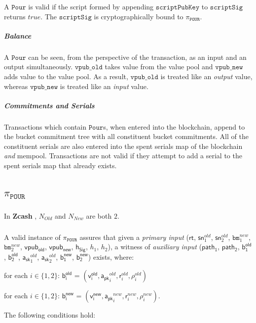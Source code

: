 \documentclass[8pt]{article}
\newcommand{\Zcash}{\textbf{Zcash} }
\newcommand{\SpendAuthorityPublic}{\mathsf{a_{pk}}}
\newcommand{\SpendAuthorityPrivate}{\mathsf{a_{sk}}}
\newcommand{\BucketRand}{\mathsf{r}}
\newcommand{\BucketAddressRand}{\mathsf{\rho}}
\newcommand{\bm}{\mathbf{\mathtt{bm}}}
\newcommand{\Pour}{\mathtt{Pour}}
\newcommand{\sn}{\mathsf{sn}}
\newcommand{\vpubOld}{\mathtt{vpub\_old}}
\newcommand{\vpubNew}{\mathtt{vpub\_new}}
\newcommand{\scriptSig}{\mathtt{scriptSig}}
\newcommand{\scriptPubKey}{\mathtt{scriptPubKey}}
\newcommand{\rt}{\mathsf{rt}}
\newcommand{\hSig}{\mathsf{h_{Sig}}}
\newcommand{\Nold}{N_{Old}}
\newcommand{\Nnew}{N_{New}}
\newcommand{\PourStatement}{\texttt{POUR}}
\newcommand{\PourProof}{\pi_{\PourStatement}}
\newcommand{\vpubold}{\mathsf{vpub_{old}}}
\newcommand{\vpubnew}{\mathsf{vpub_{new}}}
\newcommand{\bOld}[1]{\mathsf{b_{#1}^{old}}}
\newcommand{\bNew}[1]{\mathsf{b_{#1}^{new}}}
\newcommand{\vOld}[1]{\mathsf{v_{#1}^{old}}}
\newcommand{\vNew}[1]{\mathsf{v_{#1}^{new}}}
\newcommand{\path}[1]{\mathsf{path_{#1}}}
\begin{document}
A $\Pour$ is valid if the script formed by appending $\scriptPubKey$ to $\scriptSig$ returns $true$. The $\scriptSig$ is cryptographically bound to $\PourProof$.

\subparagraph{Balance}

A $\Pour$ can be seen, from the perspective of the transaction, as an input and an output simultaneously. $\vpubOld$ takes value from the value pool and $\vpubNew$ adds value to the value pool. As a result, $\vpubOld$ is treated like an \textit{output} value, whereas $\vpubNew$ is treated like an \textit{input} value.

\subparagraph{Commitments and Serials}

Transactions which contain $\Pour$s, when entered into the blockchain, append to the bucket commitment tree with all constituent bucket commitments. All of the constituent serials are also entered into the spent serials map of the blockchain \textit{and} mempool. Transactions are not valid if they attempt to add a serial to the spent serials map that already exists.

\subsection{$\PourProof$}

\subparagraph{}

In \Zcash, $\Nold$ and $\Nnew$ are both $2$.

\subparagraph{}

A valid instance of $\PourProof$ assures that given a \textit{primary input} ($\rt$, $\sn^{old}_{1}$, $\sn^{old}_{2}$, $\bm^{new}_{1}$, $\bm^{new}_{2}$, $\vpubold$, $\vpubnew$, $\hSig$, $h_1$, $h_2$), a witness of \textit{auxiliary input} ($\path{1}$, $\path{2}$, $\bOld{1}$, $\bOld{2}$, $\SpendAuthorityPrivate^{old}_1$, $\SpendAuthorityPrivate^{old}_2$, $\bNew{1}$, $\bNew{2}$) exists, where:

\begin{list}{}{}

\item for each $i \in \{1, 2\}$: $\bOld{i}$ = $(\vOld{i}, \SpendAuthorityPublic^{old}_i, \BucketRand^{old}_i, \BucketAddressRand^{old}_i)$

\item for each $i \in \{1, 2\}$: $\bNew{i}$ = $(\vNew{i}, \SpendAuthorityPublic^{new}_i, \BucketRand^{new}_i, \BucketAddressRand^{new}_i)$.

\item The following conditions hold:

\end{list}
\end{document}
